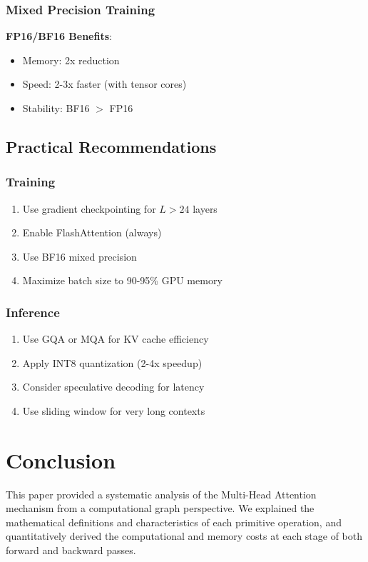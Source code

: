 \documentclass[10pt]{article}
\begin{document}
\subsubsection{Mixed Precision Training}

\textbf{FP16/BF16 Benefits}:
\begin{itemize}
  \item Memory: 2x reduction
  \item Speed: 2-3x faster (with tensor cores)
  \item Stability: BF16 $>$ FP16
\end{itemize}

\subsection{Practical Recommendations}

\subsubsection{Training}

\begin{enumerate}
  \item Use gradient checkpointing for $L > 24$ layers
  \item Enable FlashAttention (always)
  \item Use BF16 mixed precision
  \item Maximize batch size to 90-95\% GPU memory
\end{enumerate}

\subsubsection{Inference}

\begin{enumerate}
  \item Use GQA or MQA for KV cache efficiency
  \item Apply INT8 quantization (2-4x speedup)
  \item Consider speculative decoding for latency
  \item Use sliding window for very long contexts
\end{enumerate}

\section{Conclusion}

This paper provided a systematic analysis of the Multi-Head Attention mechanism from a computational graph perspective. We explained the mathematical definitions and characteristics of each primitive operation, and quantitatively derived the computational and memory costs at each stage of both forward and backward passes.
\end{document}
